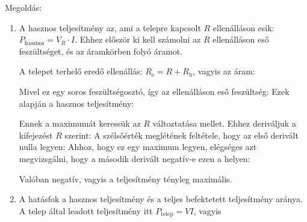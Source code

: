 
\ifdefined\megoldas
 
 Megoldás: 

 \begin{enumerate}[label=\alph*),itemsep=0pt]
  \item
   A hasznos teljesítmény az, ami a telepre kapcsolt $R$ ellenálláson esik: $P_\text{hasznos}=V_R\cdot I$. Ehhez először ki kell számolni az $R$ ellenálláson eső feszültséget, és az áramkörben folyó áramot. 

   A telepet terhelő eredő ellenállás: $R_\text{e}=R+R_\text{b}$, vagyis az áram:

   Mivel ez egy soros feszültségosztó, így az ellenálláson eső feszültség:
   Ezek alapján a hasznos teljesítmény:

   Ennek a maximumát keressük az $R$ változtatása mellet. Ehhez deriváljuk a kifejezést $R$ szerint:
   A szélsőérték meglétének feltétele, hogy az első derivált nulla legyen:
   Ahhoz, hogy ez egy maximum legyen, elégséges azt megvizsgálni, hogy a második derivált negatív-e ezen a helyen:

   Valóban negatív, vagyis a teljesítmény tényleg maximális.

  \item
   A hatásfok a hasznos teljesítmény és a teljes befektetett teljesítmény aránya. A telep által leadott teljesítmény itt $P_\text{telep}=VI$, vagyis 
 \end{enumerate}

\fi